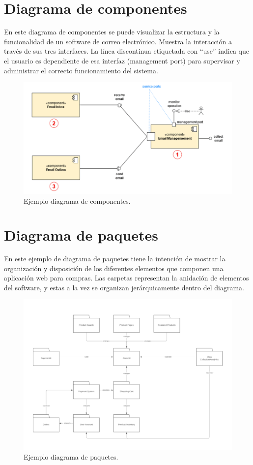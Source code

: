 \documentclass[a4paper, 12pt]{book}
\begin{document}
\section{Diagrama de componentes}
En este diagrama de componentes se puede visualizar la estructura y la funcionalidad de un software de correo electrónico. Muestra la interacción a través de sus tres interfaces. La línea discontinua etiquetada con ``use'' indica que el usuario es dependiente de esa interfaz (management port) para supervisar y administrar el correcto funcionamiento del sistema.
\begin{figure}
	\centering
	\includegraphics[width=18cm, keepaspectratio]{img/diagrama_componentes.png}
	\caption{Ejemplo diagrama de componentes.}\label{fig:diagrama_componentes}
\end{figure}

\section{Diagrama de paquetes}
En este ejemplo de diagrama de paquetes tiene la intención de mostrar la organización y disposición de los diferentes elementos que componen una aplicación web para compras. Las carpetas representan la anidación de elementos del software, y estas a la vez se organizan jerárquicamente dentro del diagrama. 
\begin{figure}
	\centering
	\includegraphics[width=14cm, keepaspectratio]{img/diagrama_paquetes.png}
	\caption{Ejemplo diagrama de paquetes.}\label{fig:diagrama_paquetes}
\end{figure}
\end{document}
